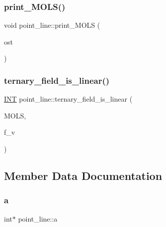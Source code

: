 \mbox{\label{classpoint__line_a65de2085e42965a52469de420274c372}} 
\subsubsection{\texorpdfstring{print\+\_\+\+M\+O\+L\+S()}{print\_MOLS()}}
{\footnotesize\ttfamily void point\+\_\+line\+::print\+\_\+\+M\+O\+LS (\begin{DoxyParamCaption}\item[{ostream \&}]{ost }\end{DoxyParamCaption})}

\mbox{\label{classpoint__line_a40fe8e6d51480cd04dbaf1764ac96682}} 
\subsubsection{\texorpdfstring{ternary\+\_\+field\+\_\+is\+\_\+linear()}{ternary\_field\_is\_linear()}}
{\footnotesize\ttfamily \mbox{\hyperlink{galois_8h_a09fddde158a3a20bd2dcadb609de11dc}{I\+NT}} point\+\_\+line\+::ternary\+\_\+field\+\_\+is\+\_\+linear (\begin{DoxyParamCaption}\item[{\mbox{\hyperlink{galois_8h_a09fddde158a3a20bd2dcadb609de11dc}{I\+NT}} $\ast$}]{M\+O\+LS,  }\item[{\mbox{\hyperlink{galois_8h_a09fddde158a3a20bd2dcadb609de11dc}{I\+NT}}}]{f\+\_\+v }\end{DoxyParamCaption})}



\subsection{Member Data Documentation}
\mbox{\label{classpoint__line_af6f3f31d462677727e21d28dc2e83e5b}} 
\subsubsection{\texorpdfstring{a}{a}}
{\footnotesize\ttfamily int$\ast$ point\+\_\+line\+::a}

